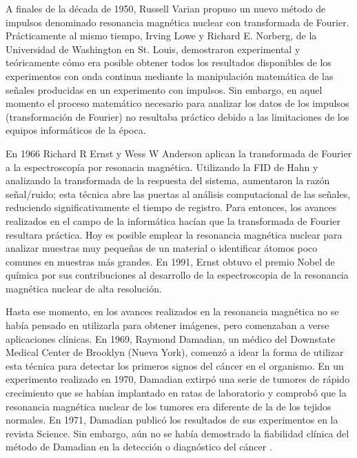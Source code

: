 A finales de la década de 1950, Russell Varian propuso un nuevo método de impulsos denominado resonancia magnética nuclear con transformada de Fourier. Prácticamente al mismo tiempo, Irving Lowe y Richard E. Norberg, de la Universidad de Washington en St. Louis, demostraron experimental y teóricamente cómo era posible obtener todos los resultados disponibles de los experimentos con onda continua mediante la manipulación matemática de las señales producidas en un experimento con impulsos. Sin embargo, en aquel momento el proceso matemático necesario para analizar los datos de los impulsos (transformación de Fourier) no resultaba práctico debido a las limitaciones de los equipos informáticos de la época.

En 1966 Richard R Ernst y Wess W Anderson  aplican la transformada de Fourier a la espectroscopía por resonacia magnética. Utilizando la FID de Hahn y analizando la transformada de la respuesta del sistema, aumentaron la razón señal/ruido; esta técnica abre las puertas al análisis computacional de las señales, reduciendo significativamente el tiempo de registro.  Para entonces, los avances realizados en el campo de la informática hacían que la transformada de Fourier resultara práctica. Hoy es posible emplear la resonancia magnética nuclear para analizar muestras muy pequeñas de un material o identificar átomos poco comunes en muestras más grandes. En 1991, Ernst obtuvo el premio Nobel de química por sus contribuciones al desarrollo de la espectroscopia de la resonancia magnética nuclear de alta resolución. 

Hasta ese momento, en los avances realizados en la resonancia magnética no se había pensado en utilizarla para obtener imágenes, pero comenzaban a verse aplicaciones clínicas. En 1969, Raymond Damadian, un médico del Downstate Medical Center de Brooklyn (Nueva York), comenzó a idear la forma de utilizar esta técnica para detectar los primeros signos del cáncer en el organismo. En un experimento realizado en 1970, Damadian extirpó una serie de tumores de rápido crecimiento que se habían implantado en ratas de laboratorio y comprobó que la resonancia magnética nuclear de los tumores era diferente de la de los tejidos normales. En 1971, Damadian publicó los resultados de sus experimentos en la revista Science. Sin embargo, aún no se había demostrado la fiabilidad clínica del método de Damadian en la detección o diagnóstico del cáncer \cite{Canals_2008}.

